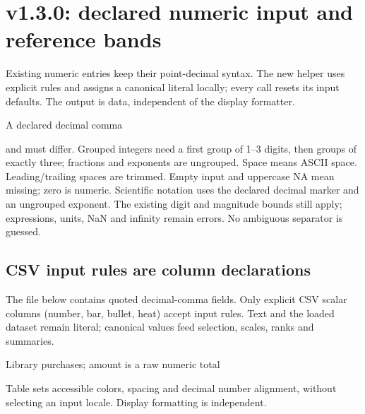 \section{v1.3.0: declared numeric input and reference bands}
Existing numeric entries keep their point-decimal syntax. The new helper uses
explicit rules and assigns a canonical literal locally; every call resets its
input defaults. The output is data, independent of the display formatter.
\begin{demo}{A declared decimal comma}
\gradbar[max=2000,width=55mm,precision=1]{\purchaseAmount}
\end{demo}
 and  must differ.
Grouped integers need a first group of 1--3 digits, then groups of exactly three;
fractions and exponents are ungrouped. Space means ASCII space. Leading/trailing
spaces are trimmed. Empty input and uppercase NA mean missing; zero is numeric.
Scientific notation uses the declared decimal marker and an ungrouped exponent.
The existing digit and magnitude bounds still apply; expressions, units, NaN
and infinity remain errors. No ambiguous separator is guessed.
\subsection{CSV input rules are column declarations}
The file below contains quoted decimal-comma fields. Only explicit CSV scalar
columns (number, bar, bullet, heat) accept input rules. Text and the loaded dataset
remain literal; canonical values feed selection, scales, ranks and summaries.
\begin{demo}{Library purchases; amount is a raw numeric total}
\begin{center}
\begin{gradtable}[data=purchases,style=regional]
\end{gradtable}
\end{center}
\end{demo}
Table  sets accessible colors, spacing and decimal number
alignment, without selecting an input locale. Display formatting is independent.
\clearpage
